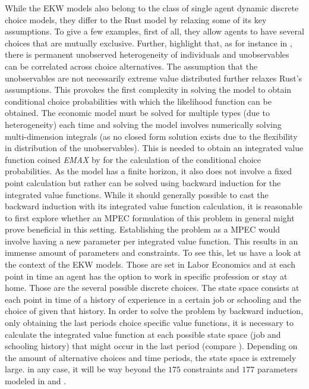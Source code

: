 While the EKW models also belong to the class of single agent dynamic discrete choice models, they differ to the Rust model by relaxing some of its key assumptions. To give a few examples, first of all, they allow agents to have several choices that are mutually exclusive. Further, \cite{Aguirregabiri.2010} highlight that, as for instance in \cite{Keane.1994}, there is permanent unobserved heterogeneity of individuals and unobservables can be correlated across choice alternatives. The assumption that the unobservables are not necessarily extreme value distributed further relaxes Rust's assumptions. This provokes the first complexity in solving the model to obtain conditional choice probabilities with which the likelihood function can be obtained. The economic model must be solved for multiple types (due to heterogeneity) each time and solving the model involves numerically solving multi-dimension integrals (as no closed form solution exists due to the flexibility in distribution of the unobservables). This is needed to obtain an integrated value function coined \textit{EMAX} by \cite{Keane.1994} for the calculation of the conditional choice probabilities. As the model has a finite horizon, it also does not involve a fixed point calculation but rather can be solved using backward induction for the integrated value functions. While it should generally possible to cast the backward induction with its integrated value function calculation, it is reasonable to first explore whether an MPEC formulation of this problem in general might prove beneficial in this setting. Establishing the problem as a MPEC would involve having a new parameter per integrated value function. This results in an immense amount of parameters and constraints. To see this, let us have a look at the context of the EKW models. Those are set in Labor Economics and at each point in time an agent has the option to work in specific profession or stay at home. Those are the several possible discrete choices. The state space consists at each point in time of a history of experience in a certain job or schooling and the choice of given that history. In order to solve the problem by backward induction, only obtaining the last periods choice specific value functions, it is necessary to calculate the integrated value function at each possible state space (job and schooling history)  that might occur in the last period (compare \cite{Aguirregabiri.2010, Keane.1994, Keane.1997}). Depending on the amount of alternative choices and time periods, the state space is extremely large. in any case, it will be way beyond the $175$ constraints and $177$ parameters modeled in \cite{Su.Judd.2012} and \cite{Iskhakov.2016}.

